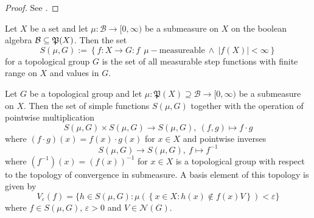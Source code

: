 \begin{proof}
  See \cite[Satz 16.16]{BvQMT}.
\end{proof}

\begin{defin}\label{defin:sf}
  Let $X$ be a set and let $\mu\colon \mathcal{B} \to [0, \infty)$ be a submeasure on $X$ on the boolean algebra $\mathcal{B} \subseteq \mathfrak{P}(X)$. Then the set
  \begin{equation*}
    S(\mu, G) := \left\{ f: X \to G\colon f \:\:\mu-\text{measureable} \: \land \: \left| f(X) \right| < \infty \right\}
  \end{equation*}
  for a topological group $G$ is the set of all measurable step functions with finite range on $X$ and values in $G$.
\end{defin}

\begin{thm}\label{thm:stop}
  Let $G$ be a topological group and let $\mu\colon \mathfrak{P}(X) \supseteq \mathcal{B} \to [0,\infty)$ be a submeasure on $X$. Then the set of simple functions $S(\mu, G)$ together with the operation of pointwise multiplication \[S(\mu, G) \times S(\mu, G) \to S(\mu, G), \: (f, g) \mapsto f \cdot g\] where $(f \cdot g)(x) = f(x) \cdot g(x)$ for $x \in X$ and pointwise inverses \[S(\mu, G) \to S(\mu, G), \: f \mapsto f^{-1}\] where $(f^{-1})(x) = (f(x))^{-1}$ for $x \in X$ is a topological group with respect to the topology of convergence in submeasure. A basis element of this topology is given by \[V_\varepsilon(f) = \{h\in S(\mu, G)\colon \mu(\left\{x\in X\colon h(x)\notin f(x)V \right\}) < \varepsilon\} \] where $f\in S(\mu, G)$, $\varepsilon > 0$ and $V \in \mathcal{N}(G)$.
\end{thm}

